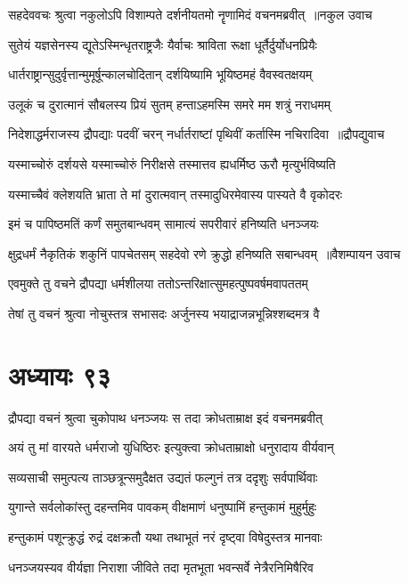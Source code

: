 \twolineshloka
{सहदेववचः श्रुत्वा नकुलोऽपि विशाम्पते}
{दर्शनीयतमो नॄणामिदं वचनमब्रवीत् ॥नकुल उवाच}


\twolineshloka
{सुतेयं यज्ञसेनस्य द्यूतेऽस्मिन्धृतराष्ट्रजैः}
{यैर्वाचः श्राविता रूक्षा धूर्तैर्दुर्योधनप्रियैः}


\twolineshloka
{धार्तराष्ट्रान्सुदुर्वृत्तान्मुमूर्षून्कालचोदितान्}
{दर्शयिष्यामि भूयिष्ठमहं वैवस्वतक्षयम्}


\twolineshloka
{उलूकं च दुरात्मानं सौबलस्य प्रियं सुतम्}
{हन्ताऽहमस्मि समरे मम शत्रुं नराधमम्}


\twolineshloka
{निदेशाद्धर्मराजस्य द्रौपद्याः पदवीं चरन्}
{नर्धार्तराष्टां पृथिवीं कर्तास्मि नचिरादिवा ॥द्रौपद्युवाच}


\twolineshloka
{यस्माच्चोरुं दर्शयसे यस्माच्चोरुं निरीक्षसे}
{तस्मात्तव ह्यधर्मिष्ठ ऊरौ मृत्युर्भविष्यति}


\twolineshloka
{यस्माच्चैवं क्लेशयति भ्राता ते मां दुरात्मवान्}
{तस्मादुधिरमेवास्य पास्यते वै वृकोदरः}


\twolineshloka
{इमं च पापिष्ठमतिं कर्णं समुतबान्धवम्}
{सामात्यं सपरीवारं हनिष्यति धनञ्जयः}


\twolineshloka
{क्षुद्रधर्मं नैकृतिकं शकुनिं पापचेतसम्}
{सहदेवो रणे क्रुद्धो हनिष्यति सबान्धवम् ॥वैशम्पायन उवाच}


\twolineshloka
{एवमुक्ते तु वचने द्रौपद्या धर्मशीलया}
{ततोऽन्तरिक्षात्सुमहत्पुष्पवर्षमवापततम्}


\twolineshloka
{तेषां तु वचनं श्रुत्वा नोचुस्तत्र सभासदः}
{अर्जुनस्य भयाद्राजन्नभून्निश्शब्दमत्र वै}


\chapter{अध्यायः ९३}
\twolineshloka
{द्रौपद्या वचनं श्रुत्वा चुकोपाथ धनञ्जयः}
{स तदा क्रोधताम्राक्ष इदं वचनमब्रवीत्}


\twolineshloka
{अयं तु मां वारयते धर्मराजो युधिष्ठिरः}
{इत्युक्त्वा क्रोधताम्राक्षो धनुरादाय वीर्यवान्}


\twolineshloka
{सव्यसाची समुत्पत्य ताञ्छत्रून्समुदैक्षत}
{उद्यतं फल्गुनं तत्र ददृशुः सर्वपार्थिवाः}


\twolineshloka
{युगान्ते सर्वलोकांस्तु दहन्तमिव पावकम्}
{वीक्षमाणं धनुष्पामिं हन्तुकामं मुहुर्मुहुः}


\twolineshloka
{हन्तुकामं पशून्क्रुद्धं रुद्रं दक्षक्रतौ यथा}
{तथाभूतं नरं दृष्ट्वा विषेदुस्तत्र मानवाः}


\twolineshloka
{धनञ्जयस्यव वीर्यज्ञा निराशा जीविते तदा}
{मृतभूता भवन्सर्वे नेत्रैरनिमिषैरिव}


